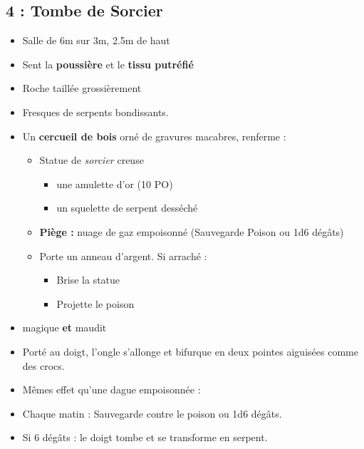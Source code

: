 \subsection{4 : Tombe de Sorcier}\label{n1:s4}
\begin{itemize}
  \item Salle de 6m sur 3m, 2.5m de haut
  \item Sent la \textbf{poussière} et le \textbf{tissu putréfié}
  \item Roche taillée grossièrement
  \item Fresques de serpents bondissants.
  \item Un \textbf{cercueil de bois} orné de gravures macabres, renferme :
  \begin{itemize}
    \item Statue de \emph{sorcier} creuse
    \begin{itemize}
      \item une amulette d’or (10 PO)
      \item un squelette de serpent desséché
    \end{itemize}
    \item \textbf{Piège :} nuage de gaz empoisonné (Sauvegarde Poison ou 1d6 dégâts)
    \item Porte un anneau d’argent. Si arraché :
    \begin{itemize}
      \item Brise la statue
      \item Projette le poison
    \end{itemize}
  \end{itemize}
\end{itemize}

\begin{highlight}
  \begin{itemize}
    \item magique \textbf{et} maudit
    \item Porté au doigt, l’ongle s’allonge et bifurque en deux pointes aiguisées comme des crocs.
    \item Mêmes effet qu'une dague empoisonnée :
    \item Chaque matin  : Sauvegarde contre le poison ou 1d6 dégâts.
    \item Si 6 dégâts :  le doigt tombe et se transforme en serpent.
  \end{itemize}
\end{highlight}


